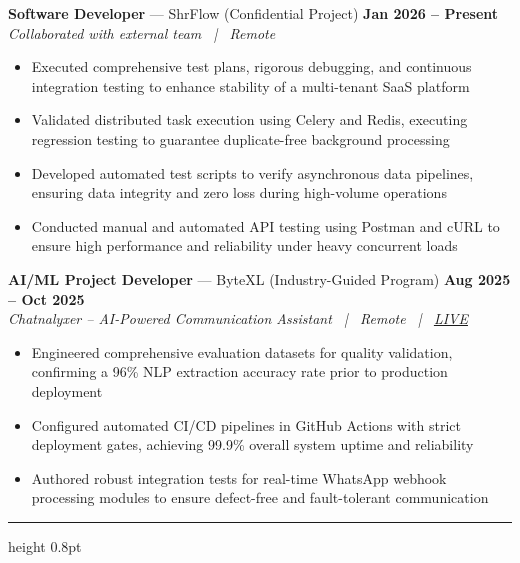 \documentclass[10pt,a4paper]{article}
\newcommand{\resumesection}[1]{%
  \vspace{5pt}%
  \noindent{\large\textbf{#1}}\par
  \vspace{1pt}%
  \hrule height 0.8pt
  \vspace{3pt}%
}
\begin{document}
\noindent\textbf{Software Developer} --- ShrFlow (Confidential Project) \hfill \textbf{Jan 2026 -- Present} \\
\textit{Collaborated with external team \ | \ Remote}
\begin{itemize}[leftmargin=1.2em, topsep=0pt, itemsep=0pt, parsep=0pt]
    \item Executed comprehensive test plans, rigorous debugging, and continuous integration testing to enhance stability of a multi-tenant SaaS platform
    \item Validated distributed task execution using Celery and Redis, executing regression testing to guarantee duplicate-free background processing
    \item Developed automated test scripts to verify asynchronous data pipelines, ensuring data integrity and zero loss during high-volume operations
    \item Conducted manual and automated API testing using Postman and cURL to ensure high performance and reliability under heavy concurrent loads
\end{itemize}

\vspace{1pt}

\noindent\textbf{AI/ML Project Developer} --- ByteXL (Industry-Guided Program) \hfill \textbf{Aug 2025 -- Oct 2025} \\
\textit{Chatnalyxer -- AI-Powered Communication Assistant \ | \ Remote \ | \ \href{http://chatnalyxer.app/}{LIVE}}
\begin{itemize}[leftmargin=1.2em, topsep=0pt, itemsep=0pt, parsep=0pt]
    \item Engineered comprehensive evaluation datasets for quality validation, confirming a 96\% NLP extraction accuracy rate prior to production deployment
    \item Configured automated CI/CD pipelines in GitHub Actions with strict deployment gates, achieving 99.9\% overall system uptime and reliability
    \item Authored robust integration tests for real-time WhatsApp webhook processing modules to ensure defect-free and fault-tolerant communication
\end{itemize}

\resumesection{PROJECTS}
\end{document}
